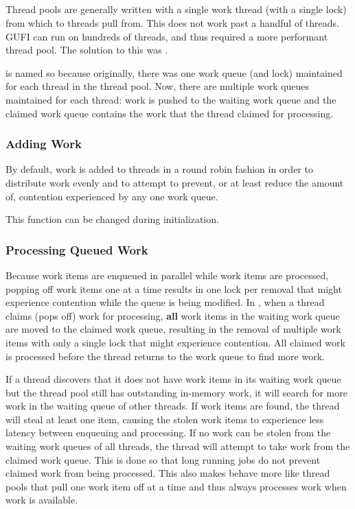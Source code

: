 \subsection{\qptp}
Thread pools are generally written with a single work thread (with a
single lock) from which to threads pull from. This does not work past
a handful of threads. GUFI can run on hundreds of threads, and thus
required a more performant thread pool. The solution to this was
\qptp.

\qptp is named so because originally, there was one work queue (and
lock) maintained for each thread in the thread pool. Now, there are
multiple work queues maintained for each thread: work is pushed to the
waiting work queue and the claimed work queue contains the work that
the thread claimed for processing.

\subsubsection{Adding Work}
By default, work is added to threads in a round robin fashion in order
to distribute work evenly and to attempt to prevent, or at least
reduce the amount of, contention experienced by any one work queue.

This function can be changed during initialization.

\subsubsection{Processing Queued Work}
Because work items are enqueued in parallel while work items are
processed, popping off work items one at a time results in one lock
per removal that might experience contention while the queue is being
modified. In \qptp, when a thread claims (pops off) work for
processing, {\bf all} work items in the waiting work queue are moved
to the claimed work queue, resulting in the removal of multiple work
items with only a single lock that might experience contention. All
claimed work is processed before the thread returns to the work queue
to find more work.

If a thread discovers that it does not have work items in its waiting
work queue but the thread pool still has outstanding in-memory work,
it will search for more work in the waiting queue of other threads. If
work items are found, the thread will steal at least one item, causing
the stolen work items to experience less latency between enqueuing and
processing. If no work can be stolen from the waiting work queues of
all threads, the thread will attempt to take work from the claimed
work queue. This is done so that long running jobs do not prevent
claimed work from being processed. This also makes \qptp behave more
like thread pools that pull one work item off at a time and thus
always processes work when work is available.

